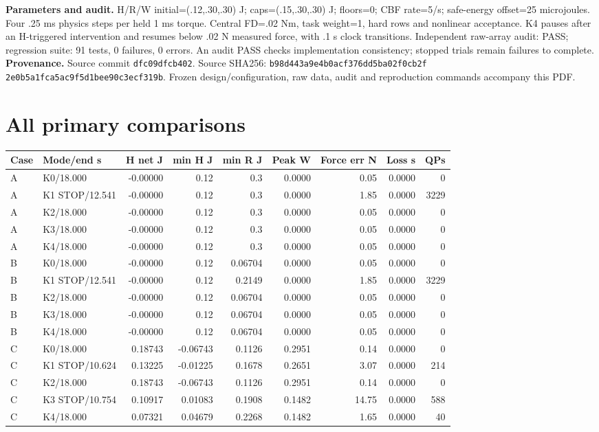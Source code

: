 \documentclass[10pt,letterpaper]{article}
\begin{document}
\textbf{Parameters and audit.} H/R/W initial=(.12,.30,.30) J; caps=(.15,.30,.30) J; floors=0; CBF rate=5/s; safe-energy offset=25 microjoules. Four .25 ms physics steps per held 1 ms torque. Central FD=.02 Nm, task weight=1, hard rows and nonlinear acceptance. K4 pauses after an H-triggered intervention and resumes below .02 N measured force, with .1 s clock transitions.
Independent raw-array audit: PASS; regression suite: 91 tests, 0 failures, 0 errors. An audit PASS checks implementation consistency; stopped trials remain failures to complete.
\textbf{Provenance.} Source commit \texttt{dfc09dfcb402}. Source SHA256: \texttt{b98d443a9e4b0acf376dd5ba02f0cb2f}\\\texttt{2e0b5a1fca5ac9f5d1bee90c3ecf319b}. Frozen design/configuration, raw data, audit and reproduction commands accompany this PDF.
\clearpage\section*{All primary comparisons}
\small\setlength{\tabcolsep}{3pt}\begin{tabular}{llrrrrrrr}\toprule Case & Mode/end s & H net J & min H J & min R J & Peak W & Force err N & Loss s & QPs\\\midrule
A & K0/18.000 & -0.00000 & 0.12 & 0.3 & 0.0000 & 0.05 & 0.0000 & 0 \\
A & K1 STOP/12.541 & -0.00000 & 0.12 & 0.3 & 0.0000 & 1.85 & 0.0000 & 3229 \\
A & K2/18.000 & -0.00000 & 0.12 & 0.3 & 0.0000 & 0.05 & 0.0000 & 0 \\
A & K3/18.000 & -0.00000 & 0.12 & 0.3 & 0.0000 & 0.05 & 0.0000 & 0 \\
A & K4/18.000 & -0.00000 & 0.12 & 0.3 & 0.0000 & 0.05 & 0.0000 & 0 \\
B & K0/18.000 & -0.00000 & 0.12 & 0.06704 & 0.0000 & 0.05 & 0.0000 & 0 \\
B & K1 STOP/12.541 & -0.00000 & 0.12 & 0.2149 & 0.0000 & 1.85 & 0.0000 & 3229 \\
B & K2/18.000 & -0.00000 & 0.12 & 0.06704 & 0.0000 & 0.05 & 0.0000 & 0 \\
B & K3/18.000 & -0.00000 & 0.12 & 0.06704 & 0.0000 & 0.05 & 0.0000 & 0 \\
B & K4/18.000 & -0.00000 & 0.12 & 0.06704 & 0.0000 & 0.05 & 0.0000 & 0 \\
C & K0/18.000 & 0.18743 & -0.06743 & 0.1126 & 0.2951 & 0.14 & 0.0000 & 0 \\
C & K1 STOP/10.624 & 0.13225 & -0.01225 & 0.1678 & 0.2651 & 3.07 & 0.0000 & 214 \\
C & K2/18.000 & 0.18743 & -0.06743 & 0.1126 & 0.2951 & 0.14 & 0.0000 & 0 \\
C & K3 STOP/10.754 & 0.10917 & 0.01083 & 0.1908 & 0.1482 & 14.75 & 0.0000 & 588 \\
C & K4/18.000 & 0.07321 & 0.04679 & 0.2268 & 0.1482 & 1.65 & 0.0000 & 40 \\
\bottomrule\end{tabular}\normalsize
\end{document}
